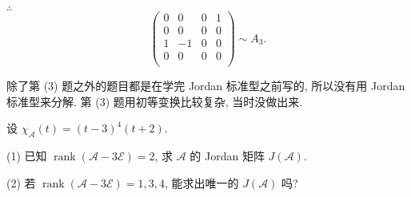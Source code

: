 \documentclass{ctexart}
\begin{document}
\begin{solution}
    $\therefore$
    \[\begin{pmatrix}
        0 & 0 & 0 & 1 \\
        0 & 0 & 0 & 0 \\
        1 & -1 & 0 & 0 \\
        0 & 0 & 0 & 0 \\
    \end{pmatrix}\sim A_3.\]
\end{solution}
\begin{note}
    除了第 (3) 题之外的题目都是在学完 Jordan 标准型之前写的, 所以没有用 Jordan 标准型来分解. 第 (3) 题用初等变换比较复杂, 当时没做出来.
\end{note}
\begin{exercise}%
    设 $\chi_\mathcal{A}(t)=(t-3)^4(t+2)$.

    (1) 已知 $\operatorname{rank}(\mathcal{A}-3\mathcal{E})=2$, 求 $\mathcal{A}$ 的 Jordan 矩阵 $J(\mathcal{A})$.

    (2) 若 $\operatorname{rank}(\mathcal{A}-3\mathcal{E})=1,3,4$, 能求出唯一的 $J(\mathcal{A})$ 吗?
\end{exercise}
\end{document}
